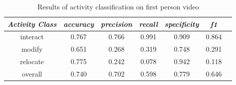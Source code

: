 \documentclass[12pt]{report}
\begin{document}
\begin{table}
\caption{Results of activity classification on first person video}
\begin{center}
\begin{tabular}{|c|c|c|c|c|c|c|}
\hline 
\textbf{\textit{Activity Class}} & \textbf{\textit{accuracy}} & \textbf{\textit{precision}} & \textbf{\textit{recall}} & \textbf{\textit{specificity}} & \textbf{\textit{f1}} \\
\hline \hline
interact & 0.767 & 0.766 & 0.991 & 0.909 & 0.864 \\
modify & 0.651 & 0.268 & 0.319 & 0.748 & 0.291 \\
relocate & 0.775 & 0.242 & 0.078 & 0.942 & 0.118 \\
\hline
overall & 0.740  & 0.702 & 0.598 & 0.779 & 0.646  \\
\hline
\end{tabular}
\label{results}
\end{center}
\end{table}
\end{document}
